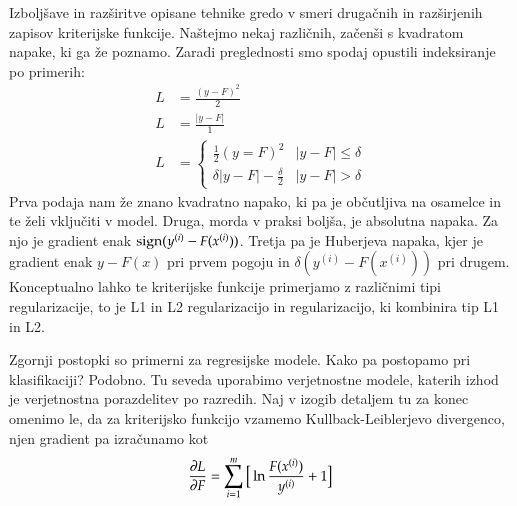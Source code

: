 Izboljšave in razširitve opisane tehnike gredo v smeri drugačnih in razširjenih zapisov kriterijske funkcije. Naštejmo nekaj različnih, začenši s kvadratom napake, ki ga že poznamo. Zaradi preglednosti smo spodaj opustili indeksiranje po primerih:
\begin{equation}
  \nonumber
  \begin{split}
    L & = \frac{(y-F)^2}{2} \\
    L & = \frac{|y-F|}{1} \\
    L & =
    \begin{cases}
      \frac{1}{2}(y=F)^2 & |y-F|\leq\delta \\
      \delta |y-F|-\frac{\delta}{2} & |y-F|>\delta
    \end{cases}
  \end{split}
\end{equation}
Prva podaja nam že znano kvadratno napako, ki pa je občutljiva na osamelce in te želi vključiti v model. Druga, morda v praksi boljša, je absolutna napaka. Za njo je gradient enak ${\rm sign}(y^{(i)}-F(x^{(i)}))$. Tretja pa je Huberjeva napaka, kjer je gradient enak $y-F(x)$ pri prvem pogoju in $\delta (y^{(i)}-F(x^{(i)}))$ pri drugem. Konceptualno lahko te kriterijske funkcije primerjamo z različnimi tipi regularizacije, to je L1 in L2 regularizacijo in regularizacijo, ki kombinira tip L1 in L2.

Zgornji postopki so primerni za regresijske modele. Kako pa postopamo pri klasifikaciji? Podobno. Tu seveda uporabimo verjetnostne modele, katerih izhod je verjetnostna porazdelitev po razredih. Naj v izogib detaljem tu za konec omenimo le, da za kriterijsko funkcijo vzamemo Kullback-Leiblerjevo divergenco, njen gradient pa izračunamo kot
\begin{equation}
  \nonumber
  \frac{\partial L}{\partial F}=\sum_{i=1}^m \big[\ln\frac{F(x^{(i)})}{y^{(i)}}+1\big]
\end{equation}

